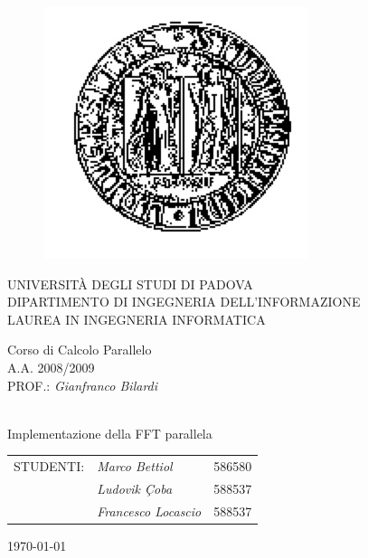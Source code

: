\begin{titlepage}

		\thispagestyle{empty}
    \begin{figure}
    \centering
    \includegraphics[scale=0.45]{immagini/tesi_logounipd2}
    \end{figure}
    
    \vskip 1.5cm{
    \begin{center}\sc
        UNIVERSIT\`A DEGLI STUDI DI PADOVA\\
        DIPARTIMENTO DI INGEGNERIA DELL'INFORMAZIONE\\
        LAUREA IN INGEGNERIA INFORMATICA\end{center}
		}
		
		\vskip1.2cm\begin{center}
    	\rm\large\expandafter{Corso di Calcolo Parallelo\\}
      \rm\large\uppercase\expandafter{A.A. 2008/2009\\}
      \rm\large\uppercase\expandafter{Prof.:}
    	\emph{Gianfranco Bilardi}\end{center}
    	
    \vskip1.6cm\begin{center}
    \HRule \\[0.4cm]\LARGE\expandafter{Implementazione della FFT parallela}
    \HRule \\[0.4cm]
    \end{center}
    
    \begin{flushright}\vskip2.0cm 
    \begin{tabular}{rll}
	   \rm\large \uppercase{Studenti:}
	   &\emph{Marco Bettiol} &586580\\
	   & \emph{Ludovik \c{C}oba} &588537\\
	   & \emph{Francesco Locascio} &588537\\
		\end{tabular}
		\end{flushright}
    \vfill\begin{center}\today \end{center}
    
\end{titlepage}

\newpage

